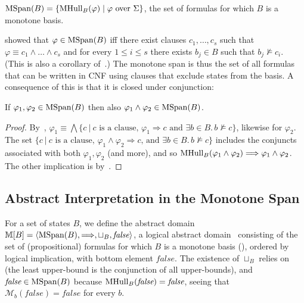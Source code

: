 \documentclass[acmsmall,screen]{acmart}
\renewcommand{\implies}{\Longrightarrow}
\newcommand{\false}{{\textit{false}}}
\newcommand{\vocabulary}{\Sigma}
\newcommand{\voc}{\vocabulary}
\newcommand{\set}[1]{\{{#1}\}}
\newcommand{\monox}[2]{\mathcal{M}_{#2}({#1})}
\newcommand{\mspan}[1]{{\rm MSpan}({#1})}
\newcommand{\mhull}[2]{{\rm MHull}_{#2}({#1})}
\newcommand{\madom}[1]{\mathbb{M}[{#1}]}
\newcommand{\join}{\mathbin{\sqcup}}
\begin{document}
\begin{definition}
\label{def:monotone-span}
$\mspan{B} = \set{\mhull{\varphi}{B} \mid \varphi \mbox{ over } \voc}$,
the set of formulas for which $B$ is a monotone basis.
\end{definition}
%
\citet{DBLP:journals/iandc/Bshouty95} showed that $\varphi \in \mspan{B}$ iff
%
there exist clauses $c_1,\ldots,c_s$ such that $\varphi \equiv c_1 \land \ldots \land c_s$ and for every $1 \leq i \leq s$ there exists $b_j \in B$ such that $b_j \not \models c_i$. (This is also a corollary of~.)
%
The monotone span is thus the set of all formulas that can be written in CNF using clauses that exclude states from the basis.
A consequence of this is that it is closed under conjunction:
\begin{lemma}
\label{lem:mspan-conjunctive-closed}
If $\varphi_1, \varphi_2 \in \mspan{B}$ then also $\varphi_1 \land \varphi_2 \in \mspan{B}$.
\end{lemma}
\begin{proof}
By~, $\varphi_1 \equiv \bigwedge{\set{c \ | \ \mbox{$c$ is a clause, } \varphi_1 \implies c \mbox{ and } \exists b \in B. \, b \not\models c}}$, likewise for $\varphi_2$. The set $\set{c \ | \ \mbox{$c$ is a clause, } \varphi_1 \land \varphi_2 \implies c \mbox{, and } \exists b \in B. \, b \not\models c}$ includes the conjuncts associated with both $\varphi_1,\varphi_2$ (and more), and so $\mhull{\varphi_1 \land \varphi_2}{B} \implies \varphi_1 \land \varphi_2$. The other implication is by~.
\end{proof}

\subsection{Abstract Interpretation in the Monotone Span}
For a set of states $B$, we define the abstract domain $\madom{B}=\langle \mspan{B}, \implies, \join_{B}, \false \rangle$, a logical abstract domain~\cite{DBLP:conf/popl/GulwaniMT08} consisting of the set of (propositional) formulas for which $B$ is a monotone basis (), ordered by logical implication, with bottom element $\false$. The existence of $\join_B$ relies on~ (the least upper-bound is the conjunction of all upper-bounds), and $\false \in \mspan{B}$ because $\mhull{\false}{B}=\false$, seeing that $\monox{\false}{b}=\false$ for every $b$.
%
\end{document}
